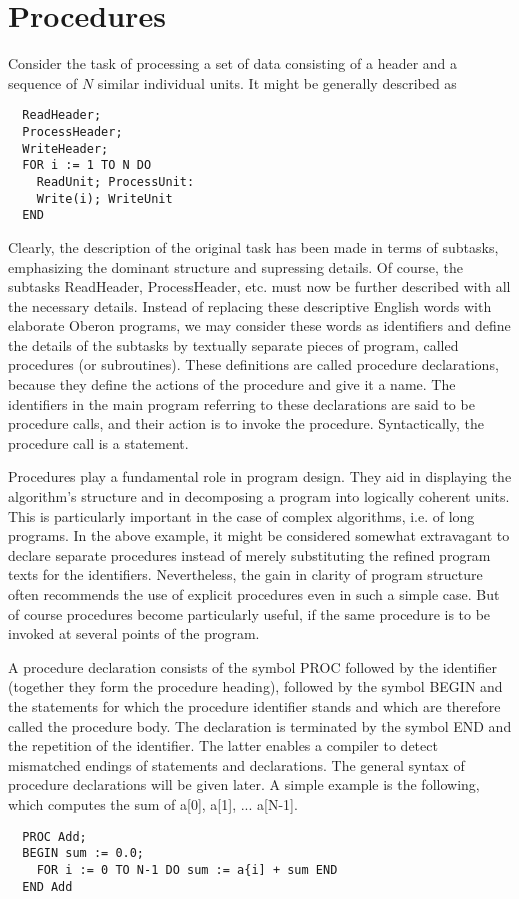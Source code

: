 \chapter{Procedures}
\label{ch:proc}
Consider the task of processing a set of data consisting of a header and a sequence of $N$ similar
individual units. It might be generally described as
\begin{verbatim}
  ReadHeader;
  ProcessHeader;
  WriteHeader;
  FOR i := 1 TO N DO
    ReadUnit; ProcessUnit:
    Write(i); WriteUnit
  END
\end{verbatim}
Clearly, the description of the original task has been made in terms of subtasks, emphasizing the
dominant structure and supressing details. Of course, the subtasks ReadHeader, ProcessHeader,
etc. must now be further described with all the necessary details. Instead of replacing these
descriptive English words with elaborate Oberon programs, we may consider these words as
identifiers and define the details of the subtasks by textually separate pieces of program, called
procedures (or subroutines). These definitions are called procedure declarations, because they
define the actions of the procedure and give it a name. The identifiers in the main program referring
to these declarations are said to be procedure calls, and their action is to invoke the procedure.
Syntactically, the procedure call is a statement.

Procedures play a fundamental role in program design. They aid in displaying the algorithm's
structure and in decomposing a program into logically coherent units. This is particularly important
in the case of complex algorithms, i.e. of long programs. In the above example, it might be
considered somewhat extravagant to declare separate procedures instead of merely substituting
the refined program texts for the identifiers. Nevertheless, the gain in clarity of program structure
often recommends the use of explicit procedures even in such a simple case. But of course
procedures become particularly useful, if the same procedure is to be invoked at several points of
the program.

A procedure declaration consists of the symbol PROC followed by the identifier (together
they form the procedure heading), followed by the symbol BEGIN and the statements for which the
procedure identifier stands and which are therefore called the procedure body. The declaration is
terminated by the symbol END and the repetition of the identifier. The latter enables a compiler to
detect mismatched endings of statements and declarations. The general syntax of procedure
declarations will be given later. A simple example is the following, which computes the sum of a[0],
a[1], ... a[N-1].
\begin{verbatim}
  PROC Add;
  BEGIN sum := 0.0;
    FOR i := 0 TO N-1 DO sum := a{i] + sum END
  END Add
\end{verbatim}

